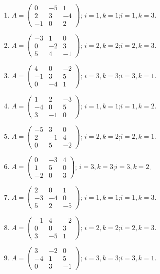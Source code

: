 \begin{enumerate}[label=\arabic*.,  leftmargin=*]
\item $A=\begin{pmatrix}0&-5&1\\2&3&-4\\-1&0&2\end{pmatrix}$; \quad $i=1, k=1$;\quad $i=1, k=3$.
\item $A=\begin{pmatrix}-3&1&0\\0&-2&3\\5&4&-1\end{pmatrix}$; \quad $i=2, k=2$;\quad $i=2, k=3$.
\item $A=\begin{pmatrix}4&0&-2\\-1&3&5\\0&-4&1\end{pmatrix}$; \quad $i=3, k=3$;\quad $i=3, k=1$.
\item $A=\begin{pmatrix}1&2&-3\\-4&0&5\\3&-1&0\end{pmatrix}$; \quad $i=1, k=1$;\quad $i=1, k=2$.
\item $A=\begin{pmatrix}-5&3&0\\2&-1&4\\0&5&-2\end{pmatrix}$; \quad $i=2, k=2$;\quad $i=2, k=1$.
\item $A=\begin{pmatrix}0&-3&4\\1&5&0\\-2&0&3\end{pmatrix}$; \quad $i=3, k=3$;\quad $i=3, k=2$.
\item $A=\begin{pmatrix}2&0&1\\-3&-4&0\\5&2&-5\end{pmatrix}$; \quad $i=1, k=1$;\quad $i=1, k=3$.
\item $A=\begin{pmatrix}-1&4&-2\\0&0&3\\3&-5&1\end{pmatrix}$; \quad $i=2, k=2$;\quad $i=2, k=3$.
\item $A=\begin{pmatrix}3&-2&0\\-4&1&5\\0&3&-1\end{pmatrix}$; \quad $i=3, k=3$;\quad $i=3, k=1$.

\end{enumerate}

